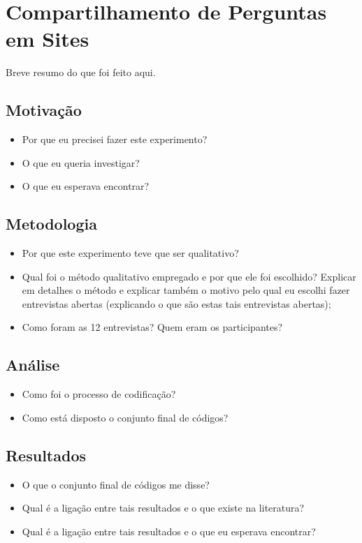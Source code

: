 \chapter{Compartilhamento de Perguntas em Sites \qa}
Breve resumo do que foi feito aqui.
\section{Motivação}
\begin{itemize}
\item Por que eu precisei fazer este experimento? 
\item O que eu queria investigar?
\item O que eu esperava encontrar?
\end{itemize}
\section{Metodologia}
\begin{itemize}
\item Por que este experimento teve que ser qualitativo?
\item Qual foi o método qualitativo empregado e por que ele foi escolhido? Explicar em detalhes o método e explicar também o motivo pelo qual eu escolhi fazer entrevistas abertas (explicando o que são estas tais entrevistas abertas);
\item Como foram as 12 entrevistas? Quem eram os participantes?
\end{itemize}
\section{Análise}
\begin{itemize}
\item Como foi o processo de codificação?
\item Como está disposto o conjunto final de códigos?
\end{itemize}
\section{Resultados}
\begin{itemize}
\item O que o conjunto final de códigos me disse?
\item Qual é a ligação entre tais resultados e o que existe na literatura?
\item Qual é a ligação entre tais resultados e o que eu esperava encontrar?
\end{itemize}
